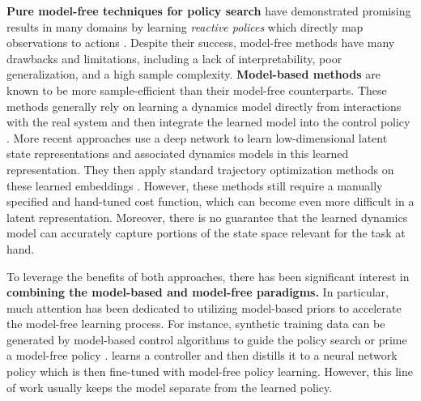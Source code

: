 \textbf{Pure model-free techniques for policy search} have
demonstrated promising results in many domains by learning
\emph{reactive polices} which directly map observations to actions
\citep{mnih2013playing,oh2016minecraft,gu2016continuous,lillicrap2015continuous,
schulman2015trust,schulman2016trpogae,gu2017qprop}.
Despite their success, model-free methods have many drawbacks and limitations,
including a lack of interpretability, poor generalization, and a
high sample complexity.
\textbf{Model-based methods} are known to be more sample-efficient
than their model-free
counterparts.
These methods generally rely on learning a dynamics model directly from
interactions with the real system and then integrate the learned model into the
control policy
\citep{schneider1997exploiting,abbeel2006using,deisenroth2011pilco,heess2015learning,
boedecker2014sparsegps}.
More recent approaches use a deep network to learn low-dimensional latent state
representations and associated dynamics models in this learned representation.
They then apply standard trajectory optimization methods
on these learned embeddings
\citep{lenz2015deepmpc, watter2015embed, levine2016end}.
However, these methods still require a manually specified and hand-tuned
cost function, which can become even more difficult in a latent representation.
Moreover, there is no guarantee that the learned dynamics model
can accurately capture portions of the state space relevant for the task at hand.

To leverage the benefits of both approaches, there has been significant
interest in \textbf{combining the model-based and model-free paradigms.}
In particular, much attention has been dedicated to utilizing
model-based priors to accelerate the model-free learning process.
For instance, synthetic training data can be generated by model-based control
algorithms to guide the policy search or prime a
model-free policy
\citep{sutton1990integrated,theodorou2010generalized,levine2014learning,
gu2016continuous,venkatraman2016improved,levine2016end,chebotar2017combining,
nagabandi2017mbmf, liting2017driving}.
\citep{bansal2017mbmf} learns a controller and then distills it to
a neural network policy which is then fine-tuned with model-free
policy learning.
However, this line of work usually keeps the model separate from the
learned policy.

